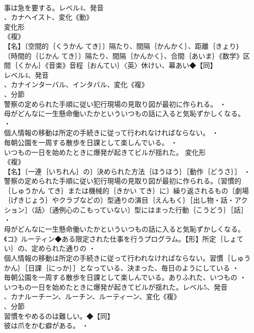 \documentclass[8pt]{extreport}
\begin{document}
\begin{CJK}{UTF8}{min}
\\	事は急を要する。レベル4、発音
\\	、カナヘイスト、変化《動》
\\	変化形 
\\	《複》
\\	【名】〔空間的｛くうかん てき｝〕隔たり、間隔｛かんかく｝、距離｛きょり｝〔時間的｛じかん てき｝〕隔たり、間隔｛かんかく｝、合間｛あいま｝《数学》区間｛くかん｝《音楽》音程｛おんてい｝〈英〉休けい、幕あい◆【同】
\\	レベル4、発音
\\	、カナインターバル、インタバル、変化《複》
\\	、分節
\\	警察の定められた手順に従い犯行現場の見取り図が最初に作られる。 ・
\\	母がどんなに一生懸命働いたかといういつもの話に入ると気恥ずかしくなる。 ・
\\	個人情報の移動は所定の手続きに従って行われなければならない。 ・
\\	毎朝公園を一周する散歩を日課として楽しんでいる。 ・
\\	いつもの一日を始めたときに爆発が起きてビルが揺れた。	変化形 
\\	《複》
\\	【名】〔一連｛いちれん｝の〕決められた方法｛ほうほう｝［動作｛どうさ｝］ ・
\\	警察の定められた手順に従い犯行現場の見取り図が最初に作られる。〔習慣的｛しゅうかん てき｝または機械的｛きかい てき｝に〕繰り返されるもの〔劇場｛げきじょう｝やクラブなどの〕型通りの演目｛えんもく｝［出し物・話・アクション］〈話〉〔通例心のこもっていない〕型にはまった行動｛こうどう｝［話］ ・
\\	母がどんなに一生懸命働いたかといういつもの話に入ると気恥ずかしくなる。《コ》ルーティン◆ある限定された仕事を行うプログラム。【形】所定｛しょてい｝の、定められた通りの ・
\\	個人情報の移動は所定の手続きに従って行われなければならない。習慣｛しゅうかん｝［日課｛にっか｝］となっている、決まった、毎日のようにしている ・
\\	毎朝公園を一周する散歩を日課として楽しんでいる。ありふれた、いつもの ・
\\	いつもの一日を始めたときに爆発が起きてビルが揺れた。レベル5、発音
\\	、カナルーチーン、ルーチン、ルーティーン、変化《複》
\\	、分節
\\	習慣をやめるのは難しい。◆【同】
\\	彼は爪をかむ癖がある。 ・

\end{CJK}
\end{document}
